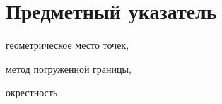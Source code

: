 \newpage

\section*{Предметный указатель}

геометрическое место точек, \pageref{term:gmt}

метод погруженной границы, \pageref{term:immersed_boundary_method}

окрестность, \pageref{term:okrestnost}
